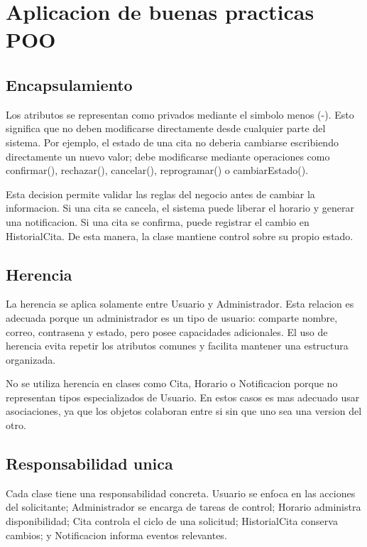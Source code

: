 \documentclass[12pt,letterpaper]{article}
\begin{document}
\section{Aplicacion de buenas practicas POO}

\subsection{Encapsulamiento}

Los atributos se representan como privados mediante el simbolo menos (-). Esto significa que no deben modificarse directamente desde cualquier parte del sistema. Por ejemplo, el estado de una cita no deberia cambiarse escribiendo directamente un nuevo valor; debe modificarse mediante operaciones como confirmar(), rechazar(), cancelar(), reprogramar() o cambiarEstado().

Esta decision permite validar las reglas del negocio antes de cambiar la informacion. Si una cita se cancela, el sistema puede liberar el horario y generar una notificacion. Si una cita se confirma, puede registrar el cambio en HistorialCita. De esta manera, la clase mantiene control sobre su propio estado.

\subsection{Herencia}

La herencia se aplica solamente entre Usuario y Administrador. Esta relacion es adecuada porque un administrador es un tipo de usuario: comparte nombre, correo, contrasena y estado, pero posee capacidades adicionales. El uso de herencia evita repetir los atributos comunes y facilita mantener una estructura organizada.

No se utiliza herencia en clases como Cita, Horario o Notificacion porque no representan tipos especializados de Usuario. En estos casos es mas adecuado usar asociaciones, ya que los objetos colaboran entre si sin que uno sea una version del otro.

\subsection{Responsabilidad unica}

Cada clase tiene una responsabilidad concreta. Usuario se enfoca en las acciones del solicitante; Administrador se encarga de tareas de control; Horario administra disponibilidad; Cita controla el ciclo de una solicitud; HistorialCita conserva cambios; y Notificacion informa eventos relevantes.
\end{document}
